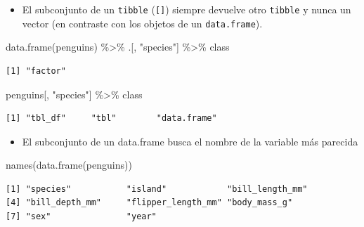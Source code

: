 \documentclass[
  letterpaper,
  DIV=11,
  numbers=noendperiod]{scrreprt}
\newenvironment{Shaded}{\begin{snugshade}}{\end{snugshade}}
\newcommand{\FunctionTok}[1]{\textcolor[rgb]{0.28,0.35,0.67}{#1}}
\newcommand{\NormalTok}[1]{\textcolor[rgb]{0.00,0.23,0.31}{#1}}
\newcommand{\SpecialCharTok}[1]{\textcolor[rgb]{0.37,0.37,0.37}{#1}}
\newcommand{\StringTok}[1]{\textcolor[rgb]{0.13,0.47,0.30}{#1}}
\providecommand{\tightlist}{%
  \setlength{\itemsep}{0pt}\setlength{\parskip}{0pt}}\usepackage{longtable,booktabs,array}
\begin{document}
\begin{itemize}
\tightlist
\item
  El subconjunto de un \texttt{tibble} (\texttt{{[}{]}}) siempre
  devuelve otro \texttt{tibble} y nunca un vector (en contraste con los
  objetos de un \texttt{data.frame}).
\end{itemize}

\begin{Shaded}
\begin{Highlighting}[]
\FunctionTok{data.frame}\NormalTok{(penguins) }\SpecialCharTok{\%\textgreater{}\%}\NormalTok{ .[, }\StringTok{"species"}\NormalTok{] }\SpecialCharTok{\%\textgreater{}\%}\NormalTok{ class}
\end{Highlighting}
\end{Shaded}

\begin{verbatim}
[1] "factor"
\end{verbatim}

\begin{Shaded}
\begin{Highlighting}[]
\NormalTok{penguins[, }\StringTok{"species"}\NormalTok{] }\SpecialCharTok{\%\textgreater{}\%}\NormalTok{ class}
\end{Highlighting}
\end{Shaded}

\begin{verbatim}
[1] "tbl_df"     "tbl"        "data.frame"
\end{verbatim}

\begin{itemize}
\tightlist
\item
  El subconjunto de un data.frame busca el nombre de la variable más
  parecida
\end{itemize}

\begin{Shaded}
\begin{Highlighting}[]
\FunctionTok{names}\NormalTok{(}\FunctionTok{data.frame}\NormalTok{(penguins))}
\end{Highlighting}
\end{Shaded}

\begin{verbatim}
[1] "species"           "island"            "bill_length_mm"   
[4] "bill_depth_mm"     "flipper_length_mm" "body_mass_g"      
[7] "sex"               "year"             
\end{verbatim}

\begin{Shaded}
\end{Shaded}
\end{document}
